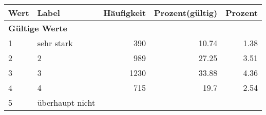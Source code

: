      \begin{longtable}{lXrrr}
     \toprule
     \textbf{Wert} & \textbf{Label} & \textbf{Häufigkeit} & \textbf{Prozent(gültig)} & \textbf{Prozent} \\
     \endhead
     \midrule
     \multicolumn{5}{l}{\textbf{Gültige Werte}}\\

     1 &
     \multicolumn{1}{X}{ sehr stark   } &


       \num{390} &
       \num[round-mode=places,round-precision=2]{10.74} &
         \num[round-mode=places,round-precision=2]{1.38} \\

     2 &
     \multicolumn{1}{X}{ 2   } &


       \num{989} &
       \num[round-mode=places,round-precision=2]{27.25} &
         \num[round-mode=places,round-precision=2]{3.51} \\

     3 &
     \multicolumn{1}{X}{ 3   } &


       \num{1230} &
       \num[round-mode=places,round-precision=2]{33.88} &
         \num[round-mode=places,round-precision=2]{4.36} \\

     4 &
     \multicolumn{1}{X}{ 4   } &


       \num{715} &
       \num[round-mode=places,round-precision=2]{19.7} &
         \num[round-mode=places,round-precision=2]{2.54} \\

     5 &
     \multicolumn{1}{X}{ überhaupt nicht   } &



\end{longtable}
